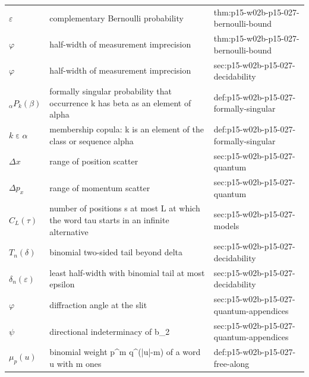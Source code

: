 \begin{longtable}{@{}p{}p{}p{}@{}}
\(\varepsilon\) & complementary Bernoulli probability & thm:\allowbreak{}p15-\allowbreak{}w02b-\allowbreak{}p15-\allowbreak{}027-\allowbreak{}bernoulli-\allowbreak{}bound \\
\(\varphi\) & half-width of measurement imprecision & thm:\allowbreak{}p15-\allowbreak{}w02b-\allowbreak{}p15-\allowbreak{}027-\allowbreak{}bernoulli-\allowbreak{}bound \\
\(\varphi\) & half-width of measurement imprecision & sec:\allowbreak{}p15-\allowbreak{}w02b-\allowbreak{}p15-\allowbreak{}027-\allowbreak{}decidability \\
\({}_{\alpha}P_k(\beta)\) & formally singular probability that occurrence k has beta as an element of alpha & def:\allowbreak{}p15-\allowbreak{}w02b-\allowbreak{}p15-\allowbreak{}027-\allowbreak{}formally-\allowbreak{}singular \\
\(k\mathrel{\varepsilon}\alpha\) & membership copula: k is an element of the class or sequence alpha & def:\allowbreak{}p15-\allowbreak{}w02b-\allowbreak{}p15-\allowbreak{}027-\allowbreak{}formally-\allowbreak{}singular \\
\(\Delta x\) & range of position scatter & sec:\allowbreak{}p15-\allowbreak{}w02b-\allowbreak{}p15-\allowbreak{}027-\allowbreak{}quantum \\
\(\Delta p_x\) & range of momentum scatter & sec:\allowbreak{}p15-\allowbreak{}w02b-\allowbreak{}p15-\allowbreak{}027-\allowbreak{}quantum \\
\(C_L(\tau)\) & number of positions s at most L at which the word tau starts in an infinite alternative & sec:\allowbreak{}p15-\allowbreak{}w02b-\allowbreak{}p15-\allowbreak{}027-\allowbreak{}models \\
\(T_n(\delta)\) & binomial two-sided tail beyond delta & sec:\allowbreak{}p15-\allowbreak{}w02b-\allowbreak{}p15-\allowbreak{}027-\allowbreak{}decidability \\
\(\delta_n(\varepsilon)\) & least half-width with binomial tail at most epsilon & sec:\allowbreak{}p15-\allowbreak{}w02b-\allowbreak{}p15-\allowbreak{}027-\allowbreak{}decidability \\
\(\varphi\) & diffraction angle at the slit & sec:\allowbreak{}p15-\allowbreak{}w02b-\allowbreak{}p15-\allowbreak{}027-\allowbreak{}quantum-\allowbreak{}appendices \\
\(\psi\) & directional indeterminacy of b\_2 & sec:\allowbreak{}p15-\allowbreak{}w02b-\allowbreak{}p15-\allowbreak{}027-\allowbreak{}quantum-\allowbreak{}appendices \\
\(\mu_p(u)\) & binomial weight p\^{}m q\^{}(|u|-m) of a word u with m ones & def:\allowbreak{}p15-\allowbreak{}w02b-\allowbreak{}p15-\allowbreak{}027-\allowbreak{}free-\allowbreak{}along \\

\end{longtable}
